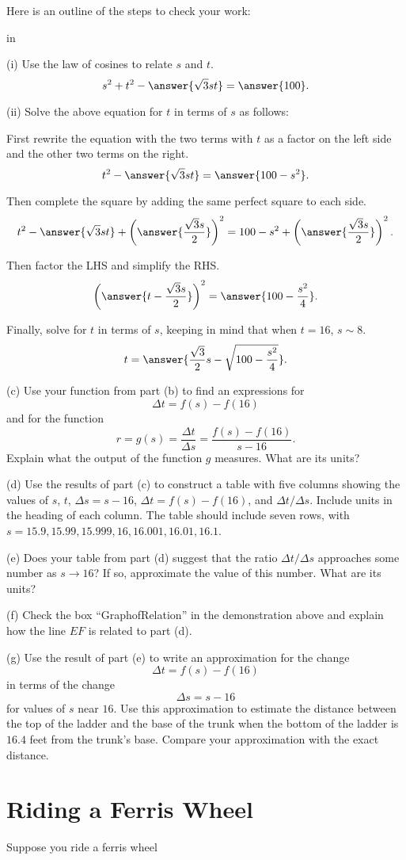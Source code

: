 \documentclass{ximera}
\newcommand{\pskip}{\vskip 0.1 in}
\begin{document}
\begin{example}
\begin{hint}
Here is an outline of the steps to check your work:

\pskip 

(i) Use the law of cosines to relate $s$ and $t$.
\[
  s^2 + t^2 - \answer{\sqrt{3}st} = \answer{100} .
\]

(ii) Solve the above equation for $t$ in terms of $s$ as follows:

First rewrite the equation with the two terms with $t$ as a factor on the left side and the other two terms on the right.
\[
     t^2 - \answer{\sqrt{3}st} = \answer{100-s^2} .
\]

Then complete the square by adding the same perfect square to each side.
\[
     t^2 - \answer{\sqrt{3}st} + \left( \answer{\frac{\sqrt{3}s}{2}} \right)^2 = 100-s^2 +  \left( \answer{\frac{\sqrt{3}s}{2}} \right)^2 .
\]

Then factor the LHS and simplify the RHS.
\[
        \left( \answer{t - \frac{\sqrt{3}s}{2}} \right)^2 = \answer{100-\frac{s^2}{4}} .
\]

Finally, solve for $t$ in terms of $s$, keeping in mind that when $t=16$, $s\sim 8$.
\[
    t = \answer{\frac{\sqrt{3}}{2}s - \sqrt{100-\frac{s^2}{4}}}  .
\]

\end{hint}



(c) Use your function from part (b) to find an expressions for
\[
  \Delta t = f(s) - f(16)
\]
and for the function
\[
  r = g(s) = \frac{\Delta t}{\Delta s} = \frac{f(s) - f(16)}{s-16} .
\]
Explain what the output of the function $g$ measures. What are its units?


(d) Use the results of part (c) to construct a table with five columns showing the values of $s$, $t$, $\Delta s = s-16$, $\Delta t =f(s)-f(16)$, and $\Delta t / \Delta s$. Include units in the heading of each column. The table should include seven rows, with $s=15.9,15.99, 15.999, 16, 16.001, 16.01, 16.1$.

(e) Does  your table from part (d) suggest that the ratio $\Delta t/ \Delta s$ approaches some number as $s \to 16$? If so, approximate the value of this number. What are its units?

(f) Check the box ``GraphofRelation'' in the demonstration above and explain how the line $EF$ is related to part (d).

(g) Use the result of part (e) to write an approximation for the change
\[
   \Delta t = f(s)- f(16)
\]
in terms of the change
\[
  \Delta s = s - 16  
\]  
for values of $s$ near $16$. Use this approximation to estimate the distance between the top of the ladder and the base of the trunk when the bottom of the ladder is $16.4$ feet from the trunk's base. Compare your approximation with the exact distance.

\end{example}





\section{Riding a Ferris Wheel}


Suppose  you ride a ferris wheel
\end{document}
